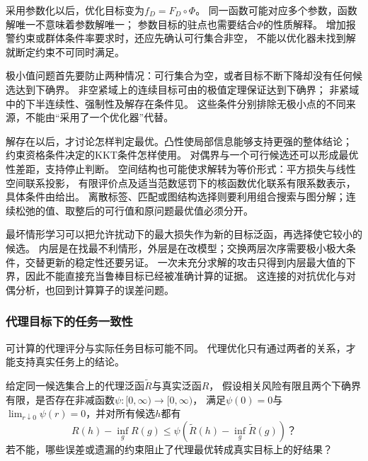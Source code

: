 采用参数化以后，优化目标变为$f_D=F_D\circ\Phi$。
同一函数可能对应多个参数，函数解唯一不意味着参数解唯一；
参数目标的驻点也需要结合$\Phi$的性质解释。
增加报警约束或群体条件率要求时，还应先确认可行集合非空，
不能以优化器未找到解就断定约束不可同时满足。

极小值问题首先要防止两种情况：可行集合为空，或者目标不断下降却没有任何候选达到下确界。
非空紧域上的连续目标可由的极值定理保证达到下确界；
非紧域中的下半连续性、强制性及解存在条件见。
这些条件分别排除无极小点的不同来源，不能由“采用了一个优化器”代替。

解存在以后，才讨论怎样判定最优。凸性使局部信息能够支持更强的整体结论；
约束资格条件决定的KKT条件怎样使用。
对偶界与一个可行候选还可以形成最优性差距，支持停止判断。
空间结构也可能使求解转为等价形式：平方损失与线性空间联系投影，
有限评价点及适当范数惩罚下的核函数优化联系有限系数表示，具体条件由给出。
离散标签、匹配或图结构选择则要利用组合搜索与图分解；连续松弛的值、取整后的可行值和原问题最优值必须分开。

最坏情形学习可以把允许扰动下的最大损失作为新的目标泛函，再选择使它较小的候选。
内层是在找最不利情形，外层是在改模型；交换两层次序需要极小极大条件，交替更新的稳定性还要另证。
一次未充分求解的攻击只得到内层最大值的下界，因此不能直接充当鲁棒目标已经被准确计算的证据。
这连接的对抗优化与对偶分析，也回到计算算子的误差问题。

\subsubsection{代理目标下的任务一致性}
\label{sec:future-analysis-proxy-risk}

可计算的代理评分与实际任务目标可能不同。
代理优化只有通过两者的关系，才能支持真实任务上的结论。

\begin{mathproblem}[代理泛函能否支持真实目标]
  \label{question:future-proxy-risk}
  给定同一候选集合上的代理泛函$\widetilde R$与真实泛函$R$，
  假设相关风险有限且两个下确界有限，是否存在非减函数$\psi:[0,\infty)\to[0,\infty)$，
  满足$\psi(0)=0$与$\lim_{r\downarrow0}\psi(r)=0$，并对所有候选$h$都有
  \[
    R(h)-\inf_gR(g)
    \leq\psi\!\left(\widetilde R(h)-\inf_g\widetilde R(g)\right)\text{？}
  \]
  若不能，哪些误差或遗漏的约束阻止了代理最优转成真实目标上的好结果？
\end{mathproblem}

